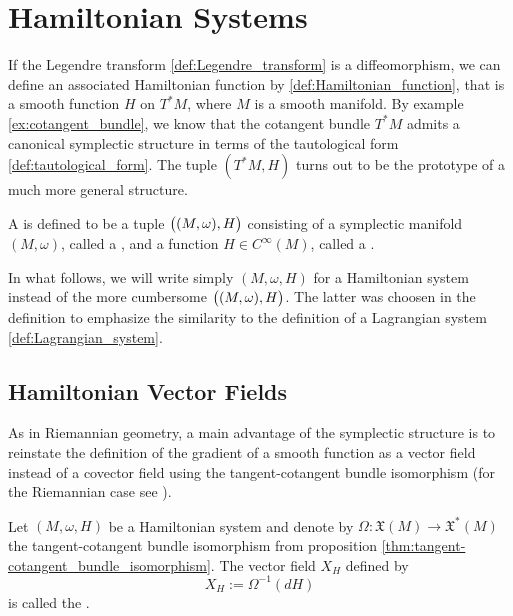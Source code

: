 \section*{Hamiltonian Systems}
If the Legendre transform \ref{def:Legendre_transform} is a diffeomorphism, we can define an associated Hamiltonian function by \ref{def:Hamiltonian_function}, that is a smooth function $H$ on $T^*M$, where $M$ is a smooth manifold. By example \ref{ex:cotangent_bundle}, we know that the cotangent bundle $T^*M$ admits a canonical symplectic structure in terms of the tautological form \ref{def:tautological_form}. The tuple $(T^*M,H)$ turns out to be the prototype of a much more general structure.

\begin{definition}
	A  is defined to be a tuple $\del[1]{(M,\omega),H}$ consisting of a symplectic manifold $(M,\omega)$, called a , and a function $H \in C^\infty(M)$, called a .
\end{definition}

\begin{remark}
	In what follows, we will write simply $(M,\omega,H)$ for a Hamiltonian system instead of the more cumbersome $\del[1]{(M,\omega),H}$. The latter was choosen in the definition to emphasize the similarity to the definition of a Lagrangian system \ref{def:Lagrangian_system}.
\end{remark}

\subsection*{Hamiltonian Vector Fields}
As in Riemannian geometry, a main advantage of the symplectic structure is to reinstate the definition of the gradient of a smooth function as a vector field instead of a covector field using the tangent-cotangent bundle isomorphism (for the Riemannian case see \cite[342--343]{lee:smooth_manifolds:2013}).

\begin{definition}
	Let $(M,\omega,H)$ be a Hamiltonian system and denote by $\Omega : \mathfrak{X}(M) \to \mathfrak{X}^*(M)$ the tangent-cotangent bundle isomorphism from proposition \textup{\ref{thm:tangent-cotangent_bundle_isomorphism}}. The vector field $X_H$ defined by
	\begin{equation}
		\label{eq:Hamiltonian_vector_field}
		X_H := \Omega^{-1}(dH)
	\end{equation}
	\noindent is called the .
\end{definition}

